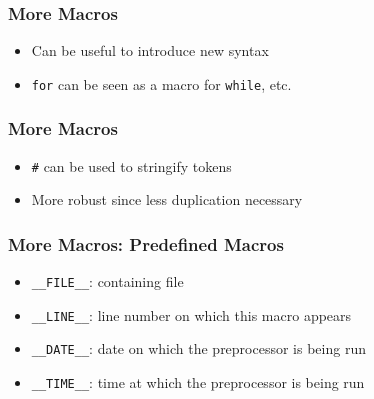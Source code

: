 \begin{frame}
  \frametitle{More Macros}
  \begin{itemize}
    \item Can be useful to introduce new syntax
    \item {\tt for} can be seen as a macro for {\tt while}, etc.
  \end{itemize}
  \begin{overprint}
  \end{overprint}
\end{frame}

\begin{frame}
  \frametitle{More Macros}
  \begin{itemize}
    \item {\tt \#} can be used to stringify tokens
    \item More robust since less duplication necessary
  \end{itemize}
  \begin{overprint}
  \end{overprint}
\end{frame}

\begin{frame}
  \frametitle{More Macros: Predefined Macros}
  \begin{itemize}
    \item {\tt \_\_FILE\_\_}: containing file
    \item {\tt \_\_LINE\_\_}: line number on which this macro appears
    \item {\tt \_\_DATE\_\_}: date on which the preprocessor is being run
    \item {\tt \_\_TIME\_\_}: time at which the preprocessor is being run
  \end{itemize}
  \begin{overprint}
  \end{overprint}
\end{frame}


